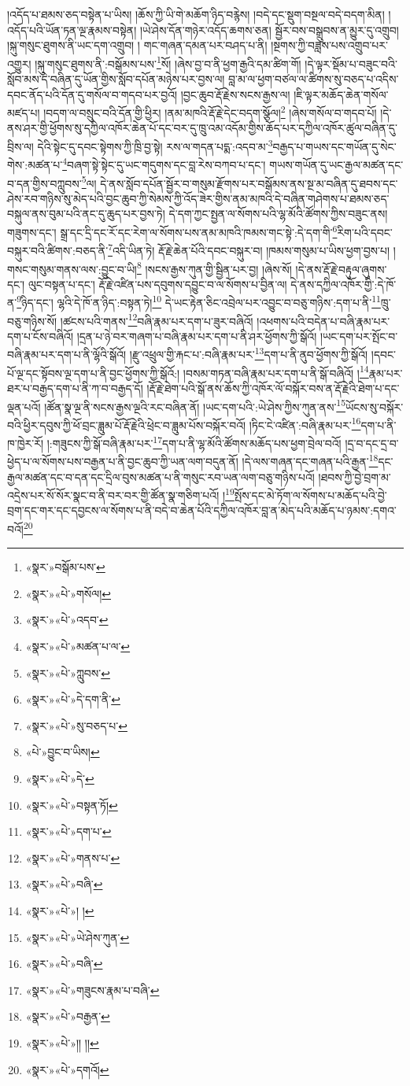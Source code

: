 །འདོད་པ་ཐམས་ཅད་བསྟེན་པ་ཡིས། །ཆོས་ཀྱི་ཡི་གེ་མཆོག་ཉིད་བརྙེས། །བདེ་དང་སྡུག་བསྔལ་བདེ་བདག་མིན། །འདོད་པའི་ཡོན་ཏན་ལྔ་རྣམས་བསྟེན། །ཡེ་ཤེས་དོན་གཉེར་འདོད་ཆགས་ཅན། སྦྱོར་བས་བསྒྲུབས་ན་མྱུར་དུ་འགྲུབ། །སྐུ་གསུང་ཐུགས་ནི་ཡང་དག་འགྲུབ། །
གང་གཞན་དམན་པར་བཤད་པ་ནི། །སྔགས་ཀྱི་བཟླས་པས་འགྲུབ་པར་འགྱུར། །སྐུ་གསུང་ཐུགས་ནི་:བསྒོམས་པས་\footnote{«སྣར་»བསྒོམ་པས་}སོ། །ཞེས་བྱ་བ་ནི་ཕྱག་རྒྱའི་དམ་ཚིག་གོ། །དེ་ལྟར་སྡོམ་པ་བཟུང་བའི་སློབ་མས་དེ་བཞིན་དུ་ཡོན་གྱིས་སློབ་དཔོན་མཉེས་པར་བྱས་ལ། བླ་མ་ལ་ཕྱག་བཙལ་ལ་ཚིགས་སུ་བཅད་པ་འདིས་དབང་ནོད་པའི་དོན་དུ་གསོལ་བ་གདབ་པར་བྱའོ། །བྱང་ཆུབ་རྡོ་རྗེས་སངས་རྒྱས་ལ། །ཇི་ལྟར་མཆོད་ཆེན་གསོལ་མཛད་པ། །བདག་ལ་བསྲུང་བའི་དོན་གྱི་ཕྱིར། །ནམ་མཁའི་རྡོ་རྗེ་དེང་བདག་སྩོལ།\footnote{«སྣར་»«པེ་»གསོལ།} །ཞེས་གསོལ་བ་གདབ་པོ། །དེ་ནས་ཤར་གྱི་ཕྱོགས་སུ་དཀྱིལ་འཁོར་ཆེན་པོ་དང་བར་དུ་ཁྲུ་འམ་འདོམ་གྱིས་ཆོད་པར་དཀྱིལ་འཁོར་ཚུལ་བཞིན་དུ་བྲིས་ལ། དེའི་སྟེང་དུ་དབང་སྟེགས་ཀྱི་ཁྲི་བྱ་སྟེ། རས་ལ་གདན་པདྨ་:འདབ་མ་\footnote{«སྣར་»«པེ་»འདབ་}བརྒྱད་པ་གཡས་དང་གཡོན་དུ་སེང་གེས་:མཚན་པ་\footnote{«སྣར་»«པེ་»མཚན་པ་ལ་}བཞག་སྟེ་སྟེང་དུ་ཡང་གདུགས་དང་བླ་རེས་བཀབ་པ་དང་། གཡས་གཡོན་དུ་ཡང་རྒྱལ་མཚན་དང་བ་དན་གྱིས་བཀླུབས་\footnote{«སྣར་»«པེ་»ཀླུབས་}ལ། དེ་ནས་སློབ་དཔོན་སྦྱོར་བ་གསུམ་རྫོགས་པར་བསྒོམས་ནས་སྔ་མ་བཞིན་དུ་ཐབས་དང་ཤེས་རབ་གཉིས་སུ་མེད་པའི་བྱང་ཆུབ་ཀྱི་སེམས་ཀྱི་འོད་ཟེར་གྱིས་ནམ་མཁའི་དེ་བཞིན་གཤེགས་པ་ཐམས་ཅད་བསྐུལ་ནས་བུམ་པའི་ནང་དུ་ཆུད་པར་བྱས་ཏེ། དེ་དག་ཀྱང་སྤྱན་ལ་སོགས་པའི་ལྷ་མོའི་ཚོགས་ཀྱིས་བཟུང་ནས། གཟུགས་དང་། སྒྲ་དང་དྲི་དང་རོ་དང་རེག་ལ་སོགས་པས་ནམ་མཁའི་ཁམས་གང་སྟེ་:དེ་དག་གི་\footnote{«སྣར་»«པེ་»དེ་དག་ནི་}རིག་པའི་དབང་བསྐུར་བའི་ཚིགས་:བཅད་ནི་\footnote{«སྣར་»«པེ་»སུ་བཅད་པ་}འདི་ཡིན་ཏེ། རྡོ་རྗེ་ཆེན་པོའི་དབང་བསྐུར་བ། །ཁམས་གསུམ་པ་ཡིས་ཕྱག་བྱས་པ། །གསང་གསུམ་གནས་ལས་:བྱུང་བ་ཡི།\footnote{«པེ་»བྱུང་བ་ཡིས།} །སངས་རྒྱས་ཀུན་གྱི་སྦྱིན་པར་བྱ། །ཞེས་སོ། །དེ་ནས་རྡོ་རྗེ་བརྟུལ་ཞུགས་དང་། ལུང་བསྟན་པ་དང་། རྡོ་རྗེ་འཛིན་པས་དབུགས་དབྱུང་བ་ལ་སོགས་པ་བྱིན་ལ། དེ་ནས་དཀྱིལ་འཁོར་གྱི་:དེ་ཁོ་ན་\footnote{«སྣར་»«པེ་»དེ་}ཉིད་དང་། ལྷའི་དེ་ཁོ་ན་ཉིད་:བསྟན་ཏེ།\footnote{«སྣར་»«པེ་»བསྟན་ཏོ།} དེ་ཡང་རྟེན་ཅིང་འབྲེལ་པར་འབྱུང་བ་བཅུ་གཉིས་:དག་པ་ནི་\footnote{«སྣར་»«པེ་»དག་པ་}ཁྲུ་བཅུ་གཉིས་སོ། །ཚངས་པའི་གནས་\footnote{«སྣར་»«པེ་»གནས་པ་}བཞི་རྣམ་པར་དག་པ་ཟུར་བཞིའོ། །འཕགས་པའི་བདེན་པ་བཞི་རྣམ་པར་དག་པ་ངོས་བཞིའོ། །དྲན་པ་ཉེ་བར་གཞག་པ་བཞི་རྣམ་པར་དག་པ་ནི་ཤར་ཕྱོགས་ཀྱི་སྒོའོ། །ཡང་དག་པར་སྤོང་བ་བཞི་རྣམ་པར་དག་པ་ནི་ལྷོའི་སྒོའོ། །རྫུ་འཕྲུལ་གྱི་རྐང་པ་:བཞི་རྣམ་པར་\footnote{«སྣར་»«པེ་»བཞི་}དག་པ་ནི་ནུབ་ཕྱོགས་ཀྱི་སྒོའོ། །དབང་པོ་ལྔ་དང་སྟོབས་ལྔ་དག་པ་ནི་བྱང་ཕྱོགས་ཀྱི་སྒོའོ:། །བསམ་གཏན་བཞི་རྣམ་པར་དག་པ་ནི་སྒོ་བཞིའོ། །\footnote{«སྣར་»«པེ་»། །}རྣམ་པར་ཐར་པ་བརྒྱད་དག་པ་ནི་ཀ་བ་བརྒྱད་དོ། །རྡོ་རྗེ་ཐེག་པའི་སྒོ་ནས་ཆོས་ཀྱི་འཁོར་ལོ་བསྐོར་བས་ན་རྡོ་རྗེའི་ཐེག་པ་དང་ལྡན་པའོ། །ཚོན་སྣ་ལྔ་ནི་སངས་རྒྱས་ལྔའི་རང་བཞིན་ནོ། །ཡང་དག་པའི་:ཡེ་ཤེས་ཀྱིས་ཀུན་ནས་\footnote{«སྣར་»«པེ་»ཡེ་ཤེས་ཀུན་}ཡོངས་སུ་བསྐོར་བའི་ཕྱིར་དབུས་ཀྱི་ཕོ་བྲང་ཟླུམ་པོ་རྡོ་རྗེའི་ཕྲེང་བ་ཟླུམ་པོས་བསྐོར་བའོ། །ཏིང་ངེ་འཛིན་:བཞི་རྣམ་པར་\footnote{«སྣར་»«པེ་»བཞི་}དག་པ་ནི་ཁ་ཁྱེར་རོ། །:གཟུངས་ཀྱི་སྒོ་བཞི་རྣམ་པར་\footnote{«སྣར་»«པེ་»གཟུངས་རྣམ་པ་བཞི་}དག་པ་ནི་ལྷ་མོའི་ཚོགས་མཆོད་པས་ཕྱག་བྲེལ་བའོ། །དྲ་བ་དང་དྲ་བ་ཕྱེད་པ་ལ་སོགས་པས་བརྒྱན་པ་ནི་བྱང་ཆུབ་ཀྱི་ཡན་ལག་བདུན་ནོ། །དེ་ལས་གཞན་དང་གཞན་པའི་རྒྱན་\footnote{«སྣར་»«པེ་»བརྒྱན་}དང་རྒྱལ་མཚན་དང་བ་དན་དང་དྲིལ་བུས་མཚན་པ་ནི་གསུང་རབ་ཡན་ལག་བཅུ་གཉིས་པའོ། །ཐབས་ཀྱི་བྱེ་བྲག་མ་འདྲེས་པར་སོ་སོར་སྣང་བ་ནི་བར་བར་གྱི་ཚོན་སྣ་གཅིག་པའོ། །\footnote{«སྣར་»«པེ་»།། །།}སྤོས་དང་མེ་ཏོག་ལ་སོགས་པ་མཆོད་པའི་བྱེ་བྲག་དང་གར་དང་དབྱངས་ལ་སོགས་པ་ནི་བདེ་བ་ཆེན་པོའི་དཀྱིལ་འཁོར་བླ་ན་མེད་པའི་མཆོད་པ་ཉམས་:དགའ་བའོ།\footnote{«སྣར་»«པེ་»དགའོ།} 